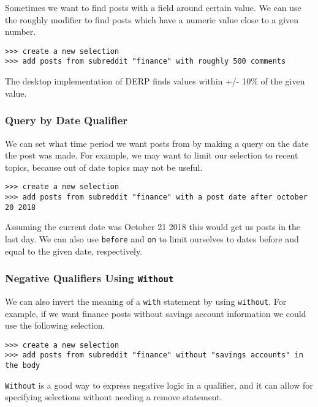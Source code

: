 Sometimes we want to find posts with a field around certain value. We can use the roughly modifier to find posts which have a numeric value close to a given number.
\begin{lstlisting}
>>> create a new selection
>>> add posts from subreddit "finance" with roughly 500 comments
\end{lstlisting}
The desktop implementation of DERP finds values within +/- 10\% of the given value.


\subsubsection{Query by Date Qualifier}
We can set what time period we want posts from by making a query on the date the post was made. For example, we may want to limit our selection to recent topics, because out of date topics may not be useful.
\begin{lstlisting}
>>> create a new selection
>>> add posts from subreddit "finance" with a post date after october 20 2018
\end{lstlisting}
Assuming the current date was October 21 2018 this would get us posts in the last day. We can also use \texttt{before} and \texttt{on} to limit ourselves to dates before and equal to the given date, respectively.



\subsubsection{Negative Qualifiers Using \texttt{Without}}
We can also invert the meaning of a \texttt{with} statement by using \texttt{without}. For example, if we want finance posts without savings account information we could use the following selection.
\begin{lstlisting}
>>> create a new selection
>>> add posts from subreddit "finance" without "savings accounts" in the body
\end{lstlisting}
\texttt{Without} is a good way to express negative logic in a qualifier, and it can allow for specifying selections without needing a remove statement.



